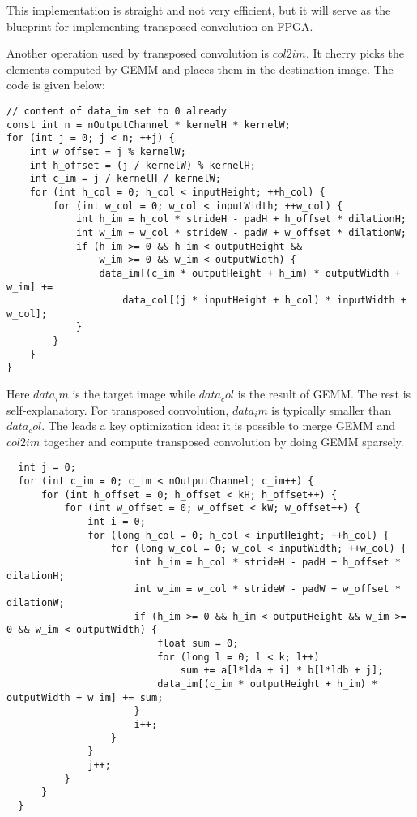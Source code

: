This implementation is straight and not very efficient, but it will serve as the blueprint for implementing
transposed convolution on FPGA.

Another operation used by transposed convolution is $col2im$. It cherry picks the elements computed by GEMM
and places them in the destination image. The code is given below:

\begin{code}
\begin{verbatim}
// content of data_im set to 0 already
const int n = nOutputChannel * kernelH * kernelW;
for (int j = 0; j < n; ++j) {
    int w_offset = j % kernelW;
    int h_offset = (j / kernelW) % kernelH;
    int c_im = j / kernelH / kernelW;
    for (int h_col = 0; h_col < inputHeight; ++h_col) {
        for (int w_col = 0; w_col < inputWidth; ++w_col) {
            int h_im = h_col * strideH - padH + h_offset * dilationH;
            int w_im = w_col * strideW - padW + w_offset * dilationW;
            if (h_im >= 0 && h_im < outputHeight &&
                w_im >= 0 && w_im < outputWidth) {
                data_im[(c_im * outputHeight + h_im) * outputWidth + w_im] +=
                    data_col[(j * inputHeight + h_col) * inputWidth + w_col];
            }
        }
    }
}
\end{verbatim}
\label{code:col2im}
\end{code}

Here $data_im$ is the target image while $data_col$ is the result of GEMM. The rest is self-explanatory.
For transposed convolution, $data_im$ is typically smaller than $data_col$. The leads a key optimization
idea: it is possible to merge GEMM and $col2im$ together and compute transposed convolution by doing GEMM
sparsely.

\begin{code}
  \begin{verbatim}
  int j = 0;
  for (int c_im = 0; c_im < nOutputChannel; c_im++) {
      for (int h_offset = 0; h_offset < kH; h_offset++) {
          for (int w_offset = 0; w_offset < kW; w_offset++) {
              int i = 0;
              for (long h_col = 0; h_col < inputHeight; ++h_col) {
                  for (long w_col = 0; w_col < inputWidth; ++w_col) {
                      int h_im = h_col * strideH - padH + h_offset * dilationH;
                      int w_im = w_col * strideW - padW + w_offset * dilationW;
                      if (h_im >= 0 && h_im < outputHeight && w_im >= 0 && w_im < outputWidth) {
                          float sum = 0;
                          for (long l = 0; l < k; l++)
                              sum += a[l*lda + i] * b[l*ldb + j];
                          data_im[(c_im * outputHeight + h_im) * outputWidth + w_im] += sum;
                      }
                      i++;
                  }
              }
              j++;
          }
      }
  }
  \end{verbatim}
  \label{code:transposed_convolution}
\end{code}

\clearpage %
